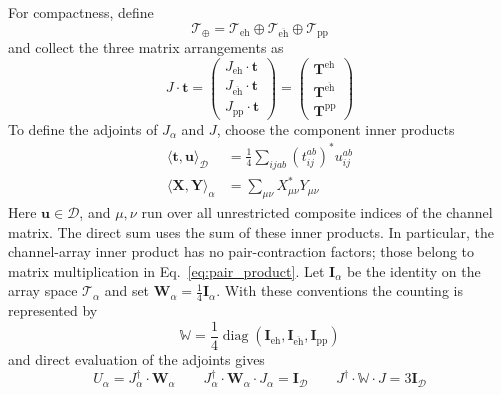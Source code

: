 \documentclass[aip,jcp,reprint,noshowkeys,superscriptaddress]{revtex4-1}
\newcommand{\eh}{\text{eh}}
\newcommand{\teh}{{\overline{\text{eh}}}}
\newcommand{\pp}{\text{pp}}
\newcommand{\bt}{\boldsymbol{t}}
\newcommand{\bT}{\boldsymbol{T}}
\newcommand{\bI}{\boldsymbol{I}}
\newcommand{\bW}{\boldsymbol{W}}
\newcommand{\bX}{\boldsymbol{X}}
\newcommand{\bY}{\boldsymbol{Y}}
\begin{document}
For compactness, define
\begin{equation}
    \mathscr T_{\oplus}
    =
    \mathscr T_{\eh}
    \oplus
    \mathscr T_{\teh}
    \oplus
    \mathscr T_{\pp}
    \label{eq:amplitude_direct_sum}
\end{equation}
and collect the three matrix arrangements as
\begin{equation}
    J\cdot\bt
    =
    \begin{pmatrix}
        J_{\eh}\cdot\bt\\
        J_{\teh}\cdot\bt\\
        J_{\pp}\cdot\bt
    \end{pmatrix}
    =
    \begin{pmatrix}
        \bT^{\eh}\\
        \bT^{\teh}\\
        \bT^{\pp}
    \end{pmatrix}
    \label{eq:J_channel_array}
\end{equation}
To define the adjoints of $J_{\alpha}$ and $J$, choose the component inner products
\begin{align}
 \langle\bt,\boldsymbol{u}\rangle_{\mathscr D}
 &=\frac14\sum_{ijab}(t_{ij}^{ab})^*u_{ij}^{ab}
 \label{eq:doubles_inner_product}
 \\
 \langle\bX,\bY\rangle_{\alpha}
 &=\sum_{\mu\nu}X_{\mu\nu}^*Y_{\mu\nu}
 \label{eq:map_inner_products}
\end{align}
Here $\boldsymbol{u}\in\mathscr D$, and $\mu,\nu$ run over all unrestricted
composite indices of the channel matrix. The direct sum uses the sum of
these inner products. In particular, the channel-array inner product has no
pair-contraction factors; those belong to matrix multiplication in
Eq.~\eqref{eq:pair_product}. Let $\bI_{\alpha}$ be the identity on the array space
$\mathscr T_{\alpha}$ and set $\bW_{\alpha}=\tfrac14\bI_{\alpha}$. With these conventions the
counting is represented by
\begin{equation}
    \mathbb W
    =
    \frac14
    \operatorname{diag}(\bI_{\eh},\bI_{\teh},\bI_{\pp})
    \label{eq:channel_weight}
\end{equation}
and direct evaluation of the adjoints gives
\begin{equation}
    U_{\alpha}=J_{\alpha}^{\dagger}\cdot \bW_{\alpha}
    \qquad
    J_{\alpha}^{\dagger}\cdot \bW_{\alpha}\cdot J_{\alpha}=\bI_{\mathscr D}
    \qquad
    J^{\dagger}\cdot\mathbb W\cdot J=3\bI_{\mathscr D}
    \label{eq:J_weight_J}
\end{equation}
\end{document}
